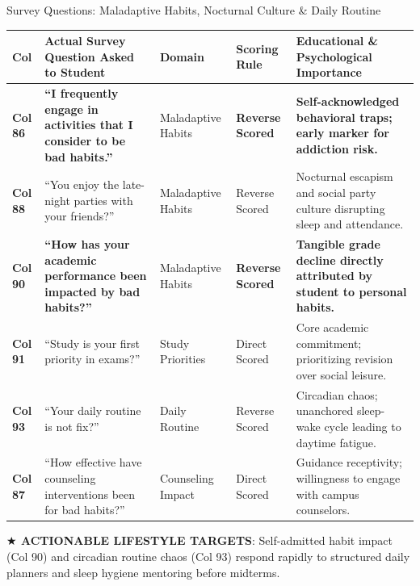 \documentclass{beamer}
\begin{document}
\begin{frame}[t]{Survey Questions: Maladaptive Habits, Nocturnal Culture \& Daily Routine}
  \begin{tcolorbox}[colback=white, colframe=BlueDeep, arc=1.2mm, boxrule=0.7pt, top=0.3mm, bottom=0.3mm, left=0.8mm, right=0.8mm]
    \fontsize{4.1pt}{4.9pt}\selectfont
    \renewcommand{\arraystretch}{0.50}
    \begin{tabularx}{\linewidth}{@{}p{0.7cm} p{4.2cm} p{1.6cm} p{1.6cm} X@{}}
      \toprule
      \rowcolor{NavyDark}
      \textbf{\color{white}Col} & \textbf{\color{white}Actual Survey Question Asked to Student} & \textbf{\color{white}Domain} & \textbf{\color{white}Scoring Rule} & \textbf{\color{white}Educational \& Psychological Importance} \\
      \midrule
      \rowcolor{GoldBG} \textbf{Col 86} & \textbf{``I frequently engage in activities that I consider to be bad habits.''} & Maladaptive Habits & \textbf{Reverse Scored} & \textbf{Self-acknowledged behavioral traps; early marker for addiction risk.} \\
      \rowcolor{BlueLight} \textbf{Col 88} & ``You enjoy the late-night parties with your friends?'' & Maladaptive Habits & Reverse Scored & Nocturnal escapism and social party culture disrupting sleep and attendance. \\
      \rowcolor{GoldBG} \textbf{Col 90} & \textbf{``How has your academic performance been impacted by bad habits?''} & Maladaptive Habits & \textbf{Reverse Scored} & \textbf{Tangible grade decline directly attributed by student to personal habits.} \\
      \midrule
      \rowcolor{CanvasBG} \textbf{Col 91} & ``Study is your first priority in exams?'' & Study Priorities & Direct Scored & Core academic commitment; prioritizing revision over social leisure. \\
      \rowcolor{BlueLight} \textbf{Col 93} & ``Your daily routine is not fix?'' & Daily Routine & Reverse Scored & Circadian chaos; unanchored sleep-wake cycle leading to daytime fatigue. \\
      \rowcolor{CanvasBG} \textbf{Col 87} & ``How effective have counseling interventions been for bad habits?'' & Counseling Impact & Direct Scored & Guidance receptivity; willingness to engage with campus counselors. \\
      \bottomrule
    \end{tabularx}
  \end{tcolorbox}
  \vspace{0.6mm}

  \begin{takeawaybanner}
    \fontsize{4.6pt}{5.6pt}\selectfont
    \textbf{\color{GoldPill}$\bigstar$ ACTIONABLE LIFESTYLE TARGETS}: Self-admitted habit impact (Col 90) and circadian routine chaos (Col 93) respond rapidly to structured daily planners and sleep hygiene mentoring before midterms.
  \end{takeawaybanner}
\end{frame}
\end{document}
